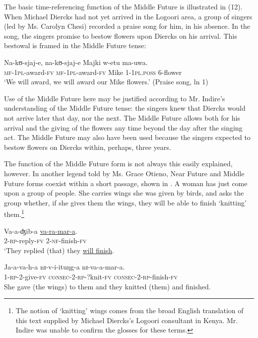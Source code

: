 \documentclass[output=paper]{langsci/langscibook}
\begin{document}
The basic time-referencing function of the Middle Future is illustrated in (12). When Michael Diercks had not yet arrived in the Logoori area, a group of singers (led by Ms. Carolyn Chesi) recorded a praise song for him, in his absence. In the song, the singers promise to bestow flowers upon Diercks on his arrival. This bestowal is framed in the Middle Future tense:

\ea\label{ex:sarvasy:12}
\gll Na-kʊ-sjaj-e,    na-kʊ-sjaj-e    Majki  w-etu    ma-uwa. \\
\textsc{mf-1pl}{}-award-\textsc{fv}  \textsc{mf-1pl-}award-\textsc{fv}  Mike  1-\textsc{1pl.poss}  6-flower \\
\glt ‘We will award, we will award our Mike flowers.’ (Praise song, ln 1)
\z

Use of the Middle Future here may be justified according to Mr. Indire’s understanding of the Middle Future tense: the singers knew that Diercks would not arrive later that day, nor the next. The Middle Future allows both for his arrival and the giving of the flowers any time beyond the day after the singing act. The Middle Future may also have been used because the singers expected to bestow flowers on Diercks within, perhaps, three years. 

The function of the Middle Future form is not always this easily explained, however. In another legend told by Ms. Grace Otieno, Near Future and Middle Future forms coexist within a short passage, shown in . A woman has just come upon a group of people. She carries wings she was given by birds, and asks the group whether, if she gives them the wings, they will be able to finish ‘knitting’ them.\footnote{ The notion of ‘knitting’ wings comes from the broad English translation of this text supplied by Michael Diercks’s Logoori consultant in Kenya. Mr. Indire was unable to confirm the glosses for these terms.}

\ea\label{ex:sarvasy:13}
\gll Va-a-ʤib-a   \underline{va-ra-mar-a}. \\
2\textsc{{}-rp}{}-reply-\textsc{fv}  2-\textsc{nf-}finish-\textsc{fv} \\
\glt ‘They replied (that) they \underline{will finish}.

\gll Ja-a-va-h-a     nɪ-v-i-ituŋg-a     nɪ-va-a-mar-a. \\
1\textsc{{}-rp-2}{}-give-\textsc{fv}    \textsc{consec-2-rp}{}-?knit-\textsc{fv}  \textsc{consec-2-rp-}finish-\textsc{fv} \\
\glt She gave (the wings) to them and they knitted (them) and finished.
\end{document}
